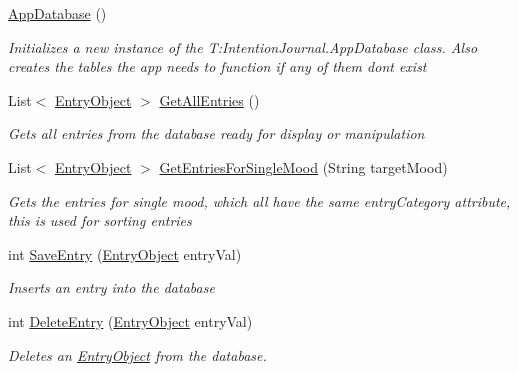 \begin{DoxyCompactItemize}
\item 
\hyperlink{class_intention_journal_1_1_app_database_ac4a9875c8d5253d2218c45ef6dd7094e}{App\+Database} ()
\begin{DoxyCompactList}\small\item\em Initializes a new instance of the T\+:\+Intention\+Journal.\+App\+Database class. Also creates the tables the app needs to function if any of them don\textquotesingle{}t exist \end{DoxyCompactList}\item 
List$<$ \hyperlink{class_intention_journal_1_1_entry_object}{Entry\+Object} $>$ \hyperlink{class_intention_journal_1_1_app_database_a59c3959015247eb6f4ad2265710e82d3}{Get\+All\+Entries} ()
\begin{DoxyCompactList}\small\item\em Gets all entries from the database ready for display or manipulation \end{DoxyCompactList}\item 
List$<$ \hyperlink{class_intention_journal_1_1_entry_object}{Entry\+Object} $>$ \hyperlink{class_intention_journal_1_1_app_database_a361d6772fd3a16d2bfca062d97a9ecde}{Get\+Entries\+For\+Single\+Mood} (String target\+Mood)
\begin{DoxyCompactList}\small\item\em Gets the entries for single mood, which all have the same entry\+Category attribute, this is used for sorting entries \end{DoxyCompactList}\item 
int \hyperlink{class_intention_journal_1_1_app_database_a0fbfd4cc628dbd28e5628cc1194e64bb}{Save\+Entry} (\hyperlink{class_intention_journal_1_1_entry_object}{Entry\+Object} entry\+Val)
\begin{DoxyCompactList}\small\item\em Inserts an entry into the database \end{DoxyCompactList}\item 
int \hyperlink{class_intention_journal_1_1_app_database_ad8769ac4a83aa71d3dcc18d5a0d9f3b2}{Delete\+Entry} (\hyperlink{class_intention_journal_1_1_entry_object}{Entry\+Object} entry\+Val)
\begin{DoxyCompactList}\small\item\em Deletes an \hyperlink{class_intention_journal_1_1_entry_object}{Entry\+Object} from the database. \end{DoxyCompactList}\item 

\end{DoxyCompactItemize}
